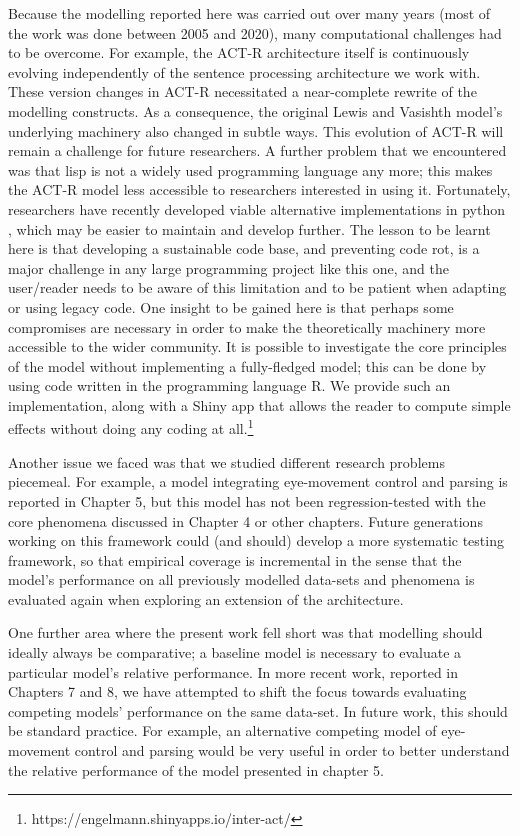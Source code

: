\documentclass{cambridge7A}\usepackage[]{graphicx}\usepackage[]{color}
\begin{document}
Because the modelling reported here was carried out over many years (most of the work was done between 2005 and 2020), many computational challenges had to be overcome. For example, the ACT-R architecture itself is continuously evolving independently of the sentence processing architecture we work with. These version  changes in ACT-R necessitated a near-complete rewrite of the modelling constructs.  As a consequence, the original Lewis and Vasishth model's underlying machinery also changed in subtle ways. This evolution of ACT-R will remain a challenge for future researchers. A further problem that we encountered was that lisp is not a widely used programming language any more; this makes the ACT-R model less accessible to researchers interested in using it. Fortunately, researchers have recently developed viable alternative implementations in python \citep{bdactrbook}, which may be easier to maintain and develop further. The lesson to be learnt here is that developing a sustainable code base, and preventing code rot, is a major challenge in any large programming project like this one, and the user/reader needs to be aware of this limitation and to be patient when adapting or using legacy code. One insight to be gained here is that perhaps some compromises are necessary in order to make the theoretically machinery more accessible to the wider community. It is possible to investigate the core principles of the model  without implementing a fully-fledged model; this can be done by using code written in the programming language R. We provide such an implementation, along with a Shiny app that allows the reader to compute simple effects without doing any coding at all.\footnote{https://engelmann.shinyapps.io/inter-act/} 

Another issue we faced was that we studied different research problems piecemeal. For example, a model integrating eye-movement control and parsing is reported in Chapter 5, but this model has not been regression-tested with the core phenomena discussed in Chapter 4 or other chapters. Future generations working on this framework could (and should) develop a more systematic testing framework, so that empirical coverage is incremental in the sense that the model's performance on all previously modelled data-sets and phenomena is evaluated again when exploring an extension of the architecture.

One further area where the present work fell short was that modelling should ideally always be comparative; a baseline model is necessary to evaluate a particular model's relative performance. In more recent work, reported in Chapters 7 and 8, we have attempted to shift the focus towards evaluating competing models' performance on the same data-set. In future work, this should be standard practice. For example, an alternative competing model of eye-movement control and parsing would be very useful in order to better understand the relative performance of the model presented in chapter 5.
\end{document}
